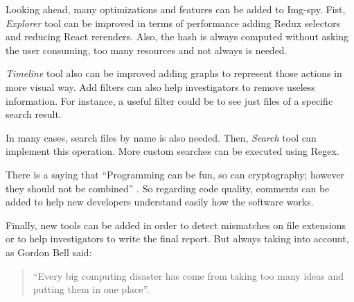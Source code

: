 Looking ahead, many optimizations and features can be added to Img-spy. Fist,
\textit{Explorer} tool can be improved in terms of performance adding Redux
selectors and reducing React rerenders. Also, the hash is always computed
without asking the user consuming, too many resources and not always is needed.

\textit{Timeline} tool also can be improved adding graphs to represent those
actions in more visual way. Add filters can also help investigators to remove
useless information. For instance, a useful filter could be to see just files
of a specific search result.

In many cases, search files by name is also needed. Then, \textit{Search} tool
can implement this operation. More custom searches can be executed using Regex.

There is a saying that “Programming can be fun, so can cryptography; however
they should not be combined” \cite{code-complete}. So regarding code quality,
comments can be added to help new developers understand easily how the software 
works.

Finally, new tools can be added in order to detect mismatches on file 
extensions or to help investigators to write the final report. But always
taking into account, as Gordon Bell said:

\begin{quote}
	“Every big computing disaster has come from taking too many ideas and putting them in one place”.
\end{quote}